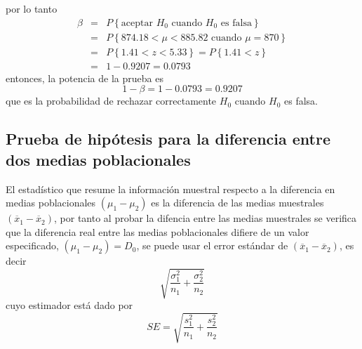 \begin{Ejem}
por lo tanto
\begin{eqnarray*}
\beta&=&P\left\{\textrm{aceptar }H_{0}\textrm{ cuando }H_{0}\textrm{ es falsa}\right\}\\
&=&P\left\{874.18<\mu<885.82\textrm{ cuando }\mu=870\right\}\\
&=&P\left\{1.41<z<5.33\right\}=P\left\{1.41<z\right\}\\
&=&1-0.9207=0.0793
\end{eqnarray*}
entonces, la potencia de la prueba es
$$1-\beta=1-0.0793=0.9207$$ que es la probabilidad de rechazar correctamente $H_{0}$ cuando $H_{0}$ es falsa.
\end{Ejem}


\subsection*{Prueba de hip\'otesis para la diferencia entre dos medias poblacionales}

El estad\'istico que resume la informaci\'on muestral respecto a la diferencia en medias poblacionales $\left(\mu_{1}-\mu_{2}\right)$ es la diferencia de las medias muestrales $\left(\overline{x}_{1}-\overline{x}_{2}\right)$, por tanto al probar la difencia entre las medias muestrales se verifica que la diferencia real entre las medias poblacionales difiere de un valor especificado, $\left(\mu_{1}-\mu_{2}\right)=D_{0}$, se puede usar el error est\'andar de $\left(\overline{x}_{1}-\overline{x}_{2}\right)$, es decir
$$\sqrt{\frac{\sigma^{2}_{1}}{n_{1}}+\frac{\sigma^{2}_{2}}{n_{2}}}$$
cuyo estimador est\'a dado por
$$SE=\sqrt{\frac{s^{2}_{1}}{n_{1}}+\frac{s^{2}_{2}}{n_{2}}}$$

